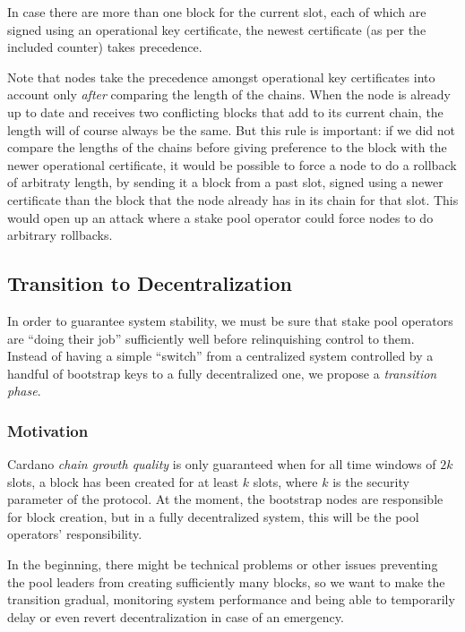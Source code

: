 \documentclass[11pt,a4paper,dvipsnames,twosided]{article}
\begin{document}
In case there are more than one block for the current slot, each of
which are signed using an operational key certificate, the newest certificate
(as per the included counter) takes precedence.

Note that nodes take the precedence amongst operational key certificates into
account only \emph{after} comparing the length of the chains. When the node is
already up to date and receives two conflicting blocks that add to its current
chain, the length will of course always be the same. But this rule is important:
if we did not compare the lengths of the chains before giving preference to the
block with the newer operational certificate, it would be possible to force a
node to do a rollback of arbitraty length, by sending it a block from a past
slot, signed using a newer certificate than the block that the node already has
in its chain for that slot. This would open up an attack where a stake pool
operator could force nodes to do arbitrary rollbacks.

\subsection{Transition to Decentralization}
\label{transition-to-decentralization}

In order to guarantee system stability, we must be sure that stake pool
operators are ``doing their job'' sufficiently well before relinquishing
control to them. Instead of having a simple ``switch'' from a
centralized system controlled by a handful of bootstrap keys to a fully
decentralized one, we propose a \emph{transition phase}.

\subsubsection{Motivation}
\label{motivation}

Cardano \emph{chain growth quality} is only guaranteed when for all time windows
of \(2k\) slots, a block has been created for at least \(k\) slots, where \(k\)
is the security parameter of the protocol. At the moment, the bootstrap nodes
are responsible for block creation, but in a fully decentralized system, this
will be the pool operators' responsibility.

In the beginning, there might be technical problems or other issues
preventing the pool leaders from creating sufficiently many blocks, so
we want to make the transition gradual, monitoring system performance
and being able to temporarily delay or even revert decentralization in
case of an emergency.
\end{document}
